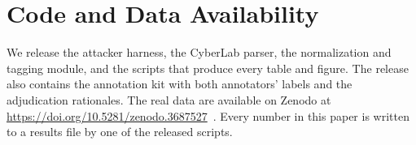 \documentclass[conference]{IEEEtran}
\begin{document}
\section*{Code and Data Availability}

We release the attacker harness, the CyberLab parser, the normalization and tagging module, and the scripts that produce every table and figure. The release also contains the annotation kit with both annotators' labels and the adjudication rationales. The real data are available on Zenodo at \url{https://doi.org/10.5281/zenodo.3687527}~\cite{sedlar2020cyberlab}. Every number in this paper is written to a results file by one of the released scripts.

{\sloppy

}
\end{document}
